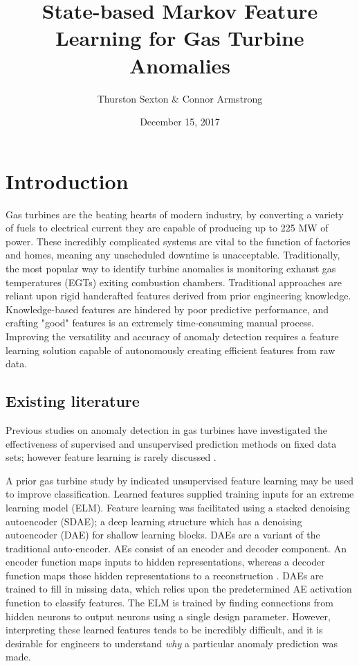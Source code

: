 \documentclass[twocolumn,10pt]{article}
\title{State-based Markov Feature Learning for Gas Turbine Anomalies}
\author{Thurston Sexton \& Connor Armstrong}
\date{December 15, 2017}
\begin{document}
\maketitle

\section{Introduction}

Gas turbines are the beating hearts of modern industry, by converting a variety of fuels to electrical current they are capable of producing up to 225 MW of power. These incredibly complicated systems are vital to the function of factories and homes, meaning any unscheduled downtime is unacceptable. Traditionally, the most popular way to identify turbine anomalies is monitoring exhaust gas temperatures (EGTs) exiting combustion chambers. Traditional approaches are reliant upon rigid handcrafted features derived from prior engineering knowledge. Knowledge-based features are hindered by poor predictive performance, and crafting "good" features is an extremely time-consuming manual process. Improving the versatility and accuracy of anomaly detection requires a feature learning solution capable of autonomously creating efficient features from raw data. 

\subsection{Existing literature}

Previous studies on anomaly detection in gas turbines have investigated the effectiveness of supervised and unsupervised prediction methods on fixed data sets; however feature learning is rarely discussed \cite{yan2015}. 

A prior gas turbine study by \citet{yan2015} indicated unsupervised feature learning may be used to improve classification. Learned features supplied training inputs for an extreme learning model (ELM). Feature learning was facilitated using a stacked denoising autoencoder (SDAE); a deep learning structure which has a denoising autoencoder (DAE) for shallow learning blocks. DAEs are a variant of the traditional auto-encoder. AEs consist of an encoder and decoder component. An encoder function maps inputs to hidden representations, whereas a decoder function maps those hidden representations to a reconstruction \cite{yan2015}. DAEs are trained to fill in missing data, which relies upon the predetermined AE activation function to classify features. The ELM is trained by finding connections from hidden neurons to output neurons using a single design parameter. However, interpreting these learned features tends to be incredibly difficult, and it is desirable for engineers to understand \textit{why} a particular anomaly prediction was made.
\end{document}
